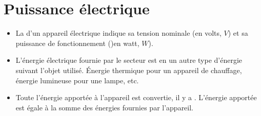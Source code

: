 \documentclass[12pt,a4paper]{article}
\date{}
\title{}
\begin{document}
	
	


%

\section{Puissance électrique}

%	
\begin{mybilan}
	\begin{itemize}
		\item La  d'un appareil électrique indique sa tension nominale (en volts, $V$) et sa puissance de fonctionnement ()en watt, $W$).
		\item L'énergie électrique fournie par le secteur est  en un autre type d'énergie suivant l'objet utilisé. \'Energie thermique pour un appareil de chauffage, énergie lumineuse pour une lampe, etc.
		\item Toute l'énergie apportée à l'appareil est convertie, il y a . L'énergie apportée est égale à la somme des énergies fournies par l'appareil.
	\end{itemize}
	
	
\end{mybilan}
\end{document}
